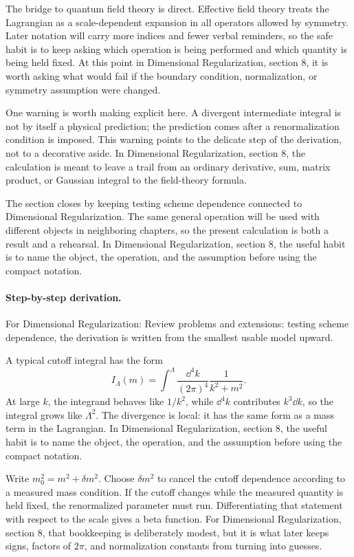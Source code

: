 The bridge to quantum field theory is direct.  Effective field theory treats the Lagrangian as a scale-dependent expansion in all operators allowed by symmetry.  Later notation will carry more indices and fewer verbal reminders, so the safe habit is to keep asking which operation is being performed and which quantity is being held fixed.  At this point in Dimensional Regularization, section 8, it is worth asking what would fail if the boundary condition, normalization, or symmetry assumption were changed.

One warning is worth making explicit here.  A divergent intermediate integral is not by itself a physical prediction; the prediction comes after a renormalization condition is imposed.  This warning points to the delicate step of the derivation, not to a decorative aside.  In Dimensional Regularization, section 8, the calculation is meant to leave a trail from an ordinary derivative, sum, matrix product, or Gaussian integral to the field-theory formula.

The section closes by keeping testing scheme dependence connected to Dimensional Regularization.  The same general operation will be used with different objects in neighboring chapters, so the present calculation is both a result and a rehearsal.  In Dimensional Regularization, section 8, the useful habit is to name the object, the operation, and the assumption before using the compact notation.



\paragraph{Step-by-step derivation.}

For Dimensional Regularization: Review problems and extensions: testing scheme dependence, the derivation is written from the smallest usable model upward.

A typical cutoff integral has the form
\[
  I_\Lambda(m)=\int^{\Lambda}\frac{\dd^4k}{(2\pi)^4}\frac{1}{k^2+m^2}.
\]
At large \(k\), the integrand behaves like \(1/k^2\), while \(\dd^4k\) contributes \(k^3\dd k\), so the integral grows like \(\Lambda^2\).  The divergence is local: it has the same form as a mass term in the Lagrangian.  In Dimensional Regularization, section 8, the useful habit is to name the object, the operation, and the assumption before using the compact notation.

Write \(m_0^2=m^2+\delta m^2\).  Choose \(\delta m^2\) to cancel the cutoff dependence according to a measured mass condition.  If the cutoff changes while the measured quantity is held fixed, the renormalized parameter must run.  Differentiating that statement with respect to the scale gives a beta function.  For Dimensional Regularization, section 8, that bookkeeping is deliberately modest, but it is what later keeps signs, factors of \(2\pi\), and normalization constants from turning into guesses.

